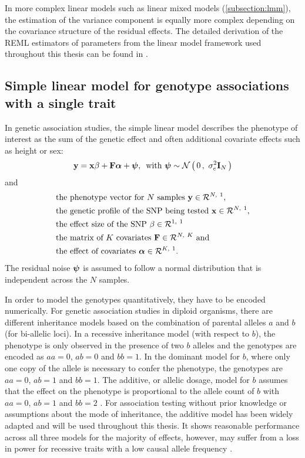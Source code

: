 In more complex linear models such as linear mixed models (\cref{subsection:lmm}), the estimation of the variance component is equally more complex depending on the covariance structure of the residual effects. The detailed derivation of the REML estimators of parameters from the linear model framework used  throughout this thesis can be found in \citep[Supplementary material]{Casale2015}. 

\subsection{Simple linear model for genotype associations with a single trait}
\label{subsection:lm-uv}
In genetic association studies, the simple linear model describes the phenotype of interest as the sum of the genetic effect and often additional covariate effects such as height or sex:
\begin{equation}
\boldsymbol{\mathbf{y}} = \boldsymbol{\mathbf{x}}\beta + \boldsymbol{\mathbf{F}}\boldsymbol{\mathbf{\alpha}} + \boldsymbol{\mathbf{\psi}}, \,\text{ with }
\boldsymbol{\mathbf{\psi}} \sim \mathcal{N}\left(\,{0}\,,~{\sigma_e^2\boldsymbol{\mathbf{I}}_{N}}\,\right)
\label{eq:lm-uv}
\end{equation}
%
and
%
\begin{align*} 
& \text{the phenotype vector for $N$ samples } \boldsymbol{\mathbf{y}} \in \mathcal{R}^{N,~1},\\
& \text{the genetic profile of the SNP being tested }\boldsymbol{\mathbf{x}} \in \mathcal{R}^{N,~1},\\
& \text{the effect size of the SNP } \beta \in \mathcal{R}^{1,~1} \\
& \text{the matrix of $K$ covariates }\boldsymbol{\mathbf{F}} \in \mathcal{R}^{N,~K} \text{ and}\\
& \text{the effect of covariates } \boldsymbol{\mathbf{\alpha}} \in \mathcal{R}^{K,~1}.
\end{align*} 
%
The residual noise \(\boldsymbol{\mathbf{\psi}}\) is assumed to follow a normal distribution that is independent across the \(N\) samples.

In order to model the genotypes quantitatively, they have to be encoded numerically. For genetic association studies in diploid organisms, there are different inheritance models based on the combination of parental alleles \(a\) and \(b\) (for bi-allelic loci). In a recessive inheritance model (with respect to \(b\)), the phenotype is only observed in the presence of two \(b\) alleles and the genotypes are encoded as \(aa=0\), \(ab=0\) and \(bb=1\). In the dominant model for \(b\), where only one copy of the allele is necessary to confer the phenotype, the genotypes are \(aa=0\), \(ab=1\) and \(bb=1\). The additive, or allelic dosage, model for \(b\) assumes that the effect on the phenotype is proportional to the allele count of \(b\) with \(aa=0\), \(ab=1\) and \(bb=2\) \citep{Bush2012}. For association testing without prior knowledge or assumptions about the mode of inheritance, the additive model has been widely adapted and will be used throughout this thesis. It shows reasonable performance across all three models for the majority of effects, however, may suffer from a loss in power for recessive traits with a low causal allele frequency \citep{Lettre2007}. 

